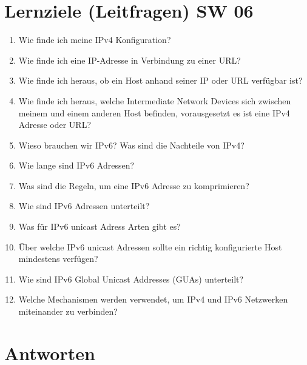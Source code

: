 \section{Lernziele (Leitfragen) SW 06}
\begin{enumerate}
    \item Wie finde ich meine IPv4 Konfiguration?
    \item Wie finde ich eine IP-Adresse in Verbindung zu einer URL?
    \item Wie finde ich heraus, ob ein Host anhand seiner IP oder URL verfügbar ist?
    \item Wie finde ich heraus, welche Intermediate Network Devices sich zwischen meinem und einem anderen Host befinden, vorausgesetzt es ist eine IPv4 Adresse oder URL?
    \item Wieso brauchen wir IPv6? Was sind die Nachteile von IPv4?
    \item Wie lange sind IPv6 Adressen?
    \item Was sind die Regeln, um eine IPv6 Adresse zu komprimieren?
    \item Wie sind IPv6 Adressen unterteilt?
    \item Was für IPv6 unicast Adress Arten gibt es?
    \item Über welche IPv6 unicast Adressen sollte ein richtig konfigurierte Host mindestens verfügen?
    \item Wie sind IPv6 Global Unicast Addresses (GUAs) unterteilt?
    \item Welche Mechanismen werden verwendet, um IPv4 und IPv6 Netzwerken miteinander zu verbinden?
\end{enumerate}

\section{Antworten}
